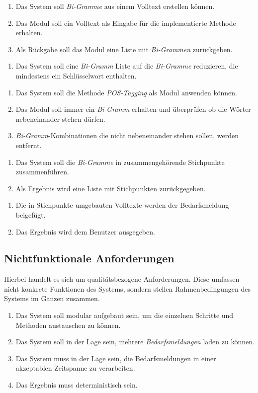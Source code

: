 \begin{enumerate}[label=5.\arabic*]
	\item Das System soll \emph{Bi-Gramme} aus einem Volltext erstellen können.
	\item Das Modul soll ein Volltext als Eingabe für die implementierte Methode erhalten.
	\item Als Rückgabe soll das Modul eine Liste mit \emph{Bi-Grammen} zurückgeben.
\end{enumerate}
\begin{enumerate}[label=6.\arabic*]
	\item Das System soll eine \emph{Bi-Gramm} Liste auf die \emph{Bi-Gramme} reduzieren, die mindestens ein Schlüsselwort enthalten.
\end{enumerate}
\begin{enumerate}[label=7.\arabic*]
	\item Das System soll die Methode \emph{POS-Tagging} als Modul anwenden können.
	\item Das Modul soll immer ein \emph{Bi-Gramm} erhalten und überprüfen ob die Wörter nebeneinander stehen dürfen.
	\item \emph{Bi-Gramm}-Kombinationen die nicht nebeneinander stehen sollen, werden entfernt.
\end{enumerate}
\begin{enumerate}[label=8.\arabic*]
	\item Das System soll die \emph{Bi-Gramme} in zusammengehörende Stichpunkte zusammenführen.
	\item Als Ergebnis wird eine Liste mit Stichpunkten zurückgegeben.
\end{enumerate}
\begin{enumerate}[label=9.\arabic*]
	\item Die in Stichpunkte umgebauten Volltexte werden der Bedarfsmeldung beigefügt.
	\item Das Ergebnis wird dem Benutzer ausgegeben.
\end{enumerate}
\subsection{Nichtfunktionale Anforderungen}
Hierbei handelt es sich um qualitätsbezogene Anforderungen. Diese umfassen nicht konkrete Funktionen des Systems, sondern stellen Rahmenbedingungen des Systems im Ganzen zusammen.
\begin{enumerate}
	\item Das System soll modular aufgebaut sein, um die einzelnen Schritte und Methoden austauschen zu können.
	\item Das System soll in der Lage sein, mehrere \emph{Bedarfsmeldungen} laden zu können.
	\item Das System muss in der Lage sein, die Bedarfsmeldungen in einer akzeptablen Zeitspanne zu verarbeiten.
	\item Das Ergebnis muss deterministisch sein.
\end{enumerate}
